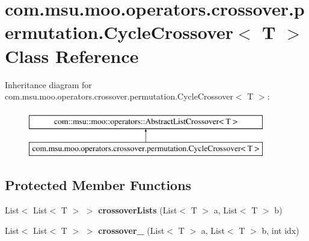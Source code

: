 \hypertarget{classcom_1_1msu_1_1moo_1_1operators_1_1crossover_1_1permutation_1_1CycleCrossover_3_01T_01_4}{\section{com.\-msu.\-moo.\-operators.\-crossover.\-permutation.\-Cycle\-Crossover$<$ T $>$ Class Reference}
\label{classcom_1_1msu_1_1moo_1_1operators_1_1crossover_1_1permutation_1_1CycleCrossover_3_01T_01_4}
}
Inheritance diagram for com.\-msu.\-moo.\-operators.\-crossover.\-permutation.\-Cycle\-Crossover$<$ T $>$\-:\begin{figure}[H]
\begin{center}
\leavevmode
\includegraphics[height=2.000000cm]{classcom_1_1msu_1_1moo_1_1operators_1_1crossover_1_1permutation_1_1CycleCrossover_3_01T_01_4}
\end{center}
\end{figure}
\subsection*{Protected Member Functions}
\begin{DoxyCompactItemize}
\item 
\hypertarget{classcom_1_1msu_1_1moo_1_1operators_1_1crossover_1_1permutation_1_1CycleCrossover_3_01T_01_4_aac01361127e47317afa35f8b4e88e5f2}{List$<$ List$<$ T $>$ $>$ {\bfseries crossover\-Lists} (List$<$ T $>$ a, List$<$ T $>$ b)}\label{classcom_1_1msu_1_1moo_1_1operators_1_1crossover_1_1permutation_1_1CycleCrossover_3_01T_01_4_aac01361127e47317afa35f8b4e88e5f2}

\item 
\hypertarget{classcom_1_1msu_1_1moo_1_1operators_1_1crossover_1_1permutation_1_1CycleCrossover_3_01T_01_4_aad24f0f50a05a39157165d045f97dc41}{List$<$ List$<$ T $>$ $>$ {\bfseries crossover\-\_\-} (List$<$ T $>$ a, List$<$ T $>$ b, int idx)}\label{classcom_1_1msu_1_1moo_1_1operators_1_1crossover_1_1permutation_1_1CycleCrossover_3_01T_01_4_aad24f0f50a05a39157165d045f97dc41}

\end{DoxyCompactItemize}


